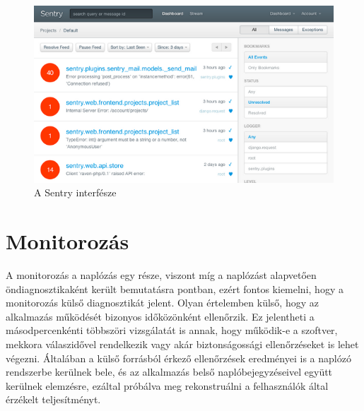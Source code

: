\begin{figure}[ht]
	\centering
		\includegraphics[scale=1]{assets/sentry.png}%
		\caption[DUMMY]%
		{A Sentry interfésze}%
		\label{fig:sentry}
\end{figure}

\section{Monitorozás}
A monitorozás a naplózás egy része, viszont míg a naplózást alapvetően öndiagnosztikaként került bemutatásra  pontban, ezért fontos kiemelni, hogy a monitorozás külső diagnosztikát jelent. Olyan értelemben külső, hogy az alkalmazás működését bizonyos időközönként ellenőrzik. Ez jelentheti a másodpercenkénti többszöri vizsgálatát is annak, hogy működik-e a szoftver, mekkora válaszidővel rendelkezik vagy akár biztonságossági ellenőrzéseket is lehet végezni. Általában a külső forrásból érkező ellenőrzések eredményei is a naplózó rendszerbe kerülnek bele, és az alkalmazás belső naplóbejegyzéseivel együtt kerülnek elemzésre, ezáltal próbálva meg rekonstruálni a felhasználók által érzékelt teljesítményt.

